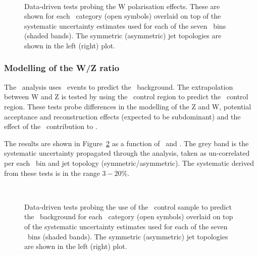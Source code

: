 \begin{figure}[h!]
  \begin{center}
    ~~
    \caption{Data-driven tests probing the W polarisation effects. 
      These are shown for each
      \njet~category (open symbols) overlaid on top of the systematic
      uncertainty estimates used for each of the seven \scalht~bins
      (shaded bands). 
      The symmetric (asymmetric) jet topologies are shown in the left (right) plot.       
    }
    \label{fig:closureMuPToMuM}
  \end{center} 
\end{figure}

\subsubsection{Modelling of the W/Z ratio}

The \alphat~analysis uses \mj~events to predict the \znunu~background. The extrapolation 
between W and Z is tested by using the \mj~control region to predict the \mmj~control region.
These tests probe differences in the modelling of the Z and W, potential acceptance and
reconstruction effects (expected to be subdominant) and the effect of 
the \ttbar~contribution to \mj.

The results are shown in Figure~\ref{fig:closureMuToMuMu} as a function of \scalht~and \njet. 
The grey band is the systematic uncertainty propagated through the analysis, 
taken as un-correlated per each \scalht~bin and jet topology (symmetric/asymmetric). The systematic derived from these tests is
in the range $3-20\%$.



\begin{figure}[h!]
  \begin{center}
    ~~
    \caption{Data-driven tests probing the use of the \mj~control sample
      to predict the \znunu~background for each
      \njet~category (open symbols) overlaid on top of the systematic
      uncertainty estimates used for each of the seven \scalht~bins (shaded bands).  
      The symmetric (asymmetric) jet topologies are shown in the left (right) plot. 
    }
    \label{fig:closureMuToMuMu}
  \end{center} 
\end{figure}
